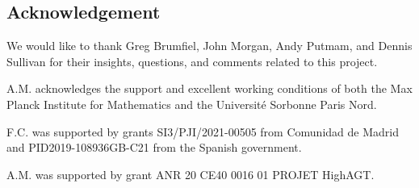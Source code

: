 
\subsection*{Acknowledgement}

We would like to thank Greg Brumfiel, John Morgan, Andy Putmam, and Dennis Sullivan for their insights, questions, and comments related to this project.

A.M. acknowledges the support and excellent working conditions of both the Max Planck Institute for Mathematics and the Universit\'e Sorbonne Paris Nord.

F.C. was supported by grants SI3/PJI/2021-00505 from Comunidad de Madrid and PID2019-108936GB-C21 from the Spanish government.

A.M. was supported by grant ANR 20 CE40 0016 01 PROJET HighAGT.